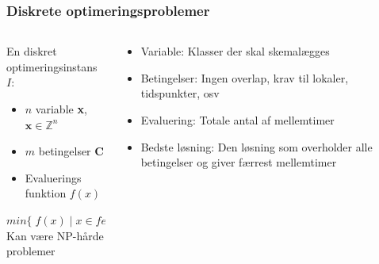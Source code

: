\documentclass[smaller]{beamer}
\begin{document}
\begin{frame}
\frametitle{Diskrete optimeringsproblemer}
\begin{columns}[T]
    \begin{column}[T]{.5\textwidth}
        \vspace{0pt}
   En diskret optimeringsinstans $I$: 
\pause
    \begin{itemize}[<+->]
\item $n$ variable \textbf{x}, $\mathbf{x} \in \mathbb{Z}^n$
\item $m$ betingelser \textbf{C}
\item Evaluerings funktion $f(x)$
\end{itemize}
  \alert{$min \{\; f(x) \;| \; x  \in feas(I)\}$ \medskip \\}
  Kan være NP-hårde problemer
 \end{column}
    \hfill
    \begin{column}[T]{.5\textwidth}
      \pause \pause
\begin{itemize}[<+->]
 \item Variable: Klasser der skal skemalægges
 \item Betingelser: Ingen overlap, krav til lokaler, tidspunkter, osv
\item Evaluering: Totale antal af mellemtimer
 \item Bedste løsning: Den løsning som overholder alle betingelser og giver færrest mellemtimer
\end{itemize}
    \end{column}
    \end{columns}
\end{frame}
\end{document}
